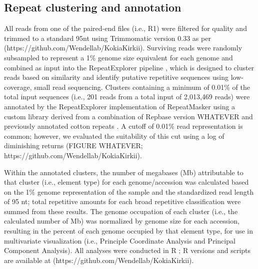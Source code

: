 \documentclass[10pt,letterpaper]{article}
\begin{document}
\subsection*{Repeat clustering and annotation}
All reads from one of the paired-end files (i.e., R1) were filtered for quality
and trimmed to a standard 95nt using Trimmomatic version 0.33 \cite{Bolger2014}
as per (https://github.com/Wendellab/KokiaKirkii). Surviving reads were randomly
subsampled to represent a 1\% genome size equivalent for each genome
\cite{Hendrix2005, Wendel2002} and combined as input into the RepeatExplorer
pipeline \cite{Novak2013, Novak2010}, which is designed to cluster reads based
on similarity and identify putative repetitive sequences using low-coverage,
small read sequencing. Clusters containing a minimum of 0.01\% of the total
input sequences (i.e., 201 reads from a total input of 2,013,469 reads) were
annotated by the RepeatExplorer implementation of RepeatMasker \cite{Smit2015}
using a custom library derived from a combination of Repbase version WHATEVER
\cite{Bao2015} and previously annotated cotton repeats \cite{Paterson2012,
  Grover2008, Grover2007, Grover2004, Hawkins2006}. A cutoff of 0.01\% read
representation is common; however, we evaluated the suitability of this cut
using a log of diminishing returns (FIGURE WHATEVER;
https://github.com/Wendellab/KokiaKirkii).

Within the annotated clusters, the number of megabases (Mb) attributable to that
cluster (i.e., element type) for each genome/accession was calculated based on
the 1\% genome representation of the sample and the standardized read length of
95 nt; total repetitive amounts for each broad repetitive classification were
summed from these results. The genome occupation of each cluster (i.e., the
calculated number of Mb) was normalized by genome size for each accession,
resulting in the percent of each genome occupied by that element type, for use
in multivariate visualization (i.e., Principle Coordinate Analysis and Principal
Component Analysis). All analyses were conducted in R \cite{R2017}; R versions
and scripts are available at (https://github.com/Wendellab/KokiaKirkii).
\end{document}
